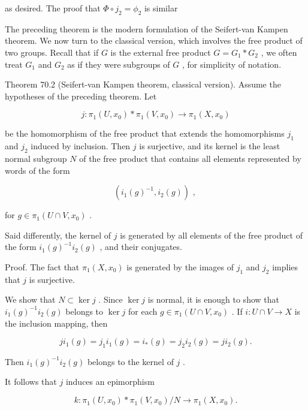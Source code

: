 as desired. The proof that \(\Phi  \circ  {j}_{2} = {\phi }_{2}\) is similar

The preceding theorem is the modern formulation of the Seifert-van Kampen theorem. We now turn to the classical version, which involves the free product of two groups. Recall that if \(G\) is the external free product \(G = {G}_{1} * {G}_{2}\) , we often treat \({G}_{1}\) and \({G}_{2}\) as if they were subgroups of \(G\) , for simplicity of notation.

Theorem 70.2 (Seifert-van Kampen theorem, classical version). Assume the hypotheses of the preceding theorem. Let

\[
j : {\pi }_{1}\left( {U,{x}_{0}}\right)  * {\pi }_{1}\left( {V,{x}_{0}}\right)  \rightarrow  {\pi }_{1}\left( {X,{x}_{0}}\right)
\]

be the homomorphism of the free product that extends the homomorphisms \({j}_{1}\) and \({j}_{2}\) induced by inclusion. Then \(j\) is surjective, and its kernel is the least normal subgroup \(N\) of the free product that contains all elements represented by words of the form

\[
\left( {{i}_{1}{\left( g\right) }^{-1},{i}_{2}\left( g\right) }\right) \text{ , }
\]

for \(g \in  {\pi }_{1}\left( {U \cap  V,{x}_{0}}\right)\) .

Said differently, the kernel of \(j\) is generated by all elements of the free product of the form \({i}_{1}{\left( g\right) }^{-1}{i}_{2}\left( g\right)\) , and their conjugates.

Proof. The fact that \({\pi }_{1}\left( {X,{x}_{0}}\right)\) is generated by the images of \({j}_{1}\) and \({j}_{2}\) implies that \(j\) is surjective.

We show that \(N \subset  \ker j\) . Since \(\ker j\) is normal, it is enough to show that \({i}_{1}{\left( g\right) }^{-1}{i}_{2}\left( g\right)\) belongs to \(\ker j\) for each \(g \in  {\pi }_{1}\left( {U \cap  V,{x}_{0}}\right)\) . If \(i : U \cap  V \rightarrow  X\) is the inclusion mapping, then

\[
j{i}_{1}\left( g\right)  = {j}_{1}{i}_{1}\left( g\right)  = {i}_{ * }\left( g\right)  = {j}_{2}{i}_{2}\left( g\right)  = j{i}_{2}\left( g\right) .
\]

Then \({i}_{1}{\left( g\right) }^{-1}{i}_{2}\left( g\right)\) belongs to the kernel of \(j\) .

It follows that \(j\) induces an epimorphism

\[
k : {\pi }_{1}\left( {U,{x}_{0}}\right)  * {\pi }_{1}\left( {V,{x}_{0}}\right) /N \rightarrow  {\pi }_{1}\left( {X,{x}_{0}}\right) .
\]

